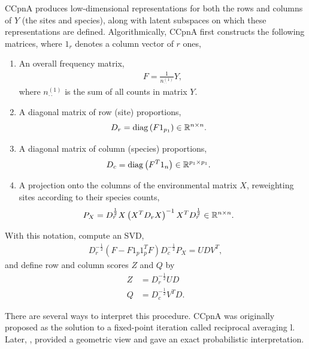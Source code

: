 \documentclass{article}
\begin{document}
CCpnA produces low-dimensional representations for both the rows and columns of
$Y$ (the sites and species), along with latent subspaces on which these
representations are defined. Algorithmically, CCpnA first constructs the
following matrices, where $1_{r}$ denotes a column vector of $r$ ones,
\begin{enumerate}
  \item An overall frequency matrix,
    \begin{align*}
      F = \frac{1}{n_{\cdot\cdot}^{(1)}} Y,
  \end{align*}
  where $n_{\cdot\cdot}^{(1)}$ is the sum of all counts in matrix
  $Y$.
\item A diagonal matrix of row (site) proportions,
  \begin{align*}
    D_{r} &= \mathop\mathrm{diag}\left(F 1_{p_{1}}\right) \in \mathbb{R}^{n \times n}.
  \end{align*}
\item A diagonal matrix of column (species) proportions,
  \begin{align*}
    D_{c} &= \mathop\mathrm{diag}\left(F^{T}1_{n}\right) \in \mathbb{R}^{p_{1} \times p_{1}}.
  \end{align*}
\item A projection onto the columns of the environmental matrix
  $X$, reweighting sites according to their species counts,
  \begin{align*}
    P_{X} &= D_{r}^{\frac{1}{2}}X\left(X^{T}D_{r}X\right)^{-1}X^{T}D_{r}^{\frac{1}{2}} \in
  \mathbb{R}^{n \times n}.
\end{align*}
\end{enumerate}

With this notation, compute an SVD,
\begin{align*}
D_{r}^{-\frac{1}{2}}\left(F - F 1_{p}1_{p}^{T}F\right)D_{c}^{-\frac{1}{2}}P_{X}
= UDV^{T},
\end{align*}
and define row and column scores $Z$ and $Q$ by
\begin{align*}
  Z &= D_{r}^{-\frac{1}{2}} UD \\
  Q &= D_{c}^{-\frac{1}{2}}V^{T}D.
\end{align*}

There are several ways to interpret this procedure. CCpnA was originally
proposed as the solution to a fixed-point iteration called reciprocal averaging
\citep{ter1986canonical}l. Later, \citep{greenacre1987geometric,
  greenacre1984theory}, provided a geometric view and \cite{zhu2005constrained}
gave an exact probabilistic interpretation.
\end{document}
